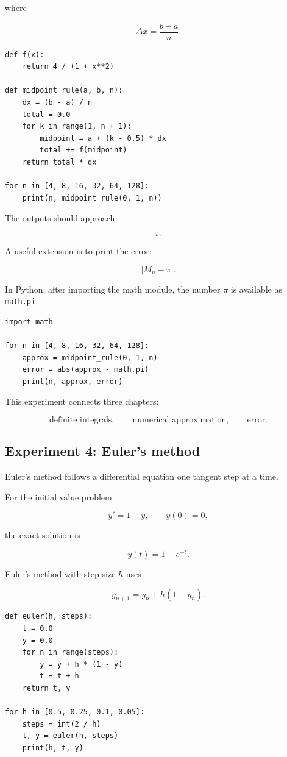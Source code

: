 where

\[
\Delta x=\frac{b-a}{n}.
\]

\begin{verbatim}
def f(x):
    return 4 / (1 + x**2)

def midpoint_rule(a, b, n):
    dx = (b - a) / n
    total = 0.0
    for k in range(1, n + 1):
        midpoint = a + (k - 0.5) * dx
        total += f(midpoint)
    return total * dx

for n in [4, 8, 16, 32, 64, 128]:
    print(n, midpoint_rule(0, 1, n))
\end{verbatim}

The outputs should approach

\[
\pi.
\]

A useful extension is to print the error:

\[
|M_n-\pi|.
\]

In Python, after importing the math module, the number \(\pi\) is available as
\texttt{math.pi}.

\begin{verbatim}
import math

for n in [4, 8, 16, 32, 64, 128]:
    approx = midpoint_rule(0, 1, n)
    error = abs(approx - math.pi)
    print(n, approx, error)
\end{verbatim}

This experiment connects three chapters:

\[
\text{definite integrals},
\qquad
\text{numerical approximation},
\qquad
\text{error}.
\]

\subsection{Experiment 4: Euler's method}
\label{appsubsec:python-euler-method}

Euler's method follows a differential equation one tangent step at a time.

For the initial value problem

\[
y'=1-y,
\qquad
y(0)=0,
\]

the exact solution is

\[
y(t)=1-e^{-t}.
\]

Euler's method with step size \(h\) uses

\[
y_{n+1}=y_n+h(1-y_n).
\]

\begin{verbatim}
def euler(h, steps):
    t = 0.0
    y = 0.0
    for n in range(steps):
        y = y + h * (1 - y)
        t = t + h
    return t, y

for h in [0.5, 0.25, 0.1, 0.05]:
    steps = int(2 / h)
    t, y = euler(h, steps)
    print(h, t, y)
\end{verbatim}

